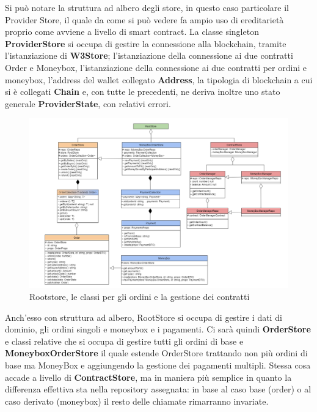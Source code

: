 Si può notare la struttura ad albero degli store, in questo caso particolare il Provider Store, 
il quale da come si può vedere fa ampio uso di ereditarietà proprio come avviene a livello di smart contract.
La classe singleton \textbf{ProviderStore} si occupa di gestire la connessione alla blockchain, tramite l'istanziazione di \textbf{W3Store}; 
l'istanziazione della connessione ai due contratti Order e Moneybox, 
l'istanziazione della  connessione ai due contratti per ordini e moneybox, l'address del wallet collegato \textbf{Address}, la tipologia di blockchain a cui si è collegati \textbf{Chain} e, con tutte le precedenti, 
ne deriva inoltre uno stato generale \textbf{ProviderState}, con relativi errori.
\clearpage

\begin{figure}[H]
    \centering
    \includegraphics[scale = 0.5]{immagini/rootstore.png}
    \caption{Rootstore, le classi per gli ordini e la gestione dei contratti}
\end{figure}

Anch'esso con struttura ad albero, RootStore si occupa di gestire i dati di dominio, gli ordini singoli e moneybox e i pagamenti.
Ci sarà quindi \textbf{OrderStore} e classi relative che si occupa di gestire tutti gli ordini di base 
e \textbf{MoneyboxOrderStore} il quale estende OrderStore trattando non più ordini di base ma MoneyBox e aggiungendo la gestione dei pagamenti multipli.
Stessa cosa accade a livello di \textbf{ContractStore}, ma in maniera più semplice in quanto la differenza effettiva sta nella repository assegnata: in base al caso base (order) o al caso derivato (moneybox) il resto delle chiamate rimarranno invariate.

